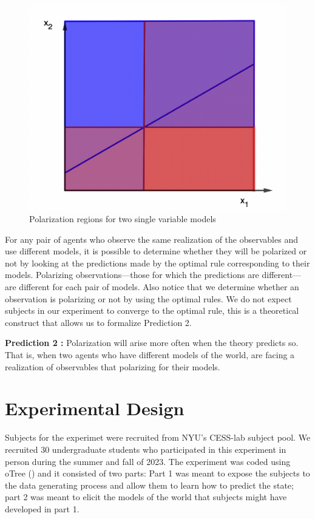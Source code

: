 \documentclass[
  12pt,
]{article}
\begin{document}
\begin{figure}

{\centering \includegraphics[width=0.5\linewidth]{../diagram_polariazation_2variables} 

}

\caption{\label{examp} Polarization regions for two single variable models}\label{fig:unnamed-chunk-1}
\end{figure}

For any pair of agents who observe the same realization of the
observables and use different models, it is possible to determine
whether they will be polarized or not by looking at the predictions made
by the optimal rule corresponding to their models. Polarizing
observations---those for which the predictions are different---are
different for each pair of models. Also notice that we determine whether
an observation is polarizing or not by using the optimal rules. We do
not expect subjects in our experiment to converge to the optimal rule,
this is a theoretical construct that allows us to formalize Prediction
2.

\textbf{Prediction 2 :} Polarization will arise more often when the
theory predicts so. That is, when two agents who have different models
of the world, are facing a realization of observables that polarizing
for their models.

\hypertarget{experimental-design}{%
\section{Experimental Design}\label{experimental-design}}

Subjects for the experimet were recruited from NYU's CESS-lab subject
pool. We recruited 30 undergraduate students who participated in this
experiment in person during the summer and fall of 2023. The experiment
was coded using oTree (\citet{otree}) and it consisted of two parts:
Part 1 was meant to expose the subjects to the data generating process
and allow them to learn how to predict the state; part 2 was meant to
elicit the models of the world that subjects might have developed in
part 1.
\end{document}
